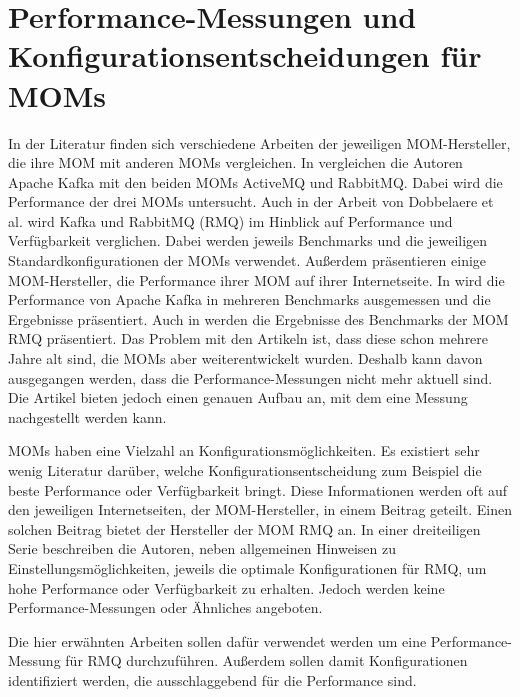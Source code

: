 \section{Performance-Messungen und Konfigurationsentscheidungen für MOMs}
\label{sec:config_mom}
In der Literatur finden sich verschiedene Arbeiten der jeweiligen MOM-Hersteller, die ihre MOM mit anderen MOMs vergleichen. In \cite{kafka} vergleichen die Autoren Apache Kafka mit den beiden MOMs ActiveMQ und RabbitMQ. Dabei wird die Performance der drei MOMs untersucht. Auch in der Arbeit von Dobbelaere et al. \cite{Dobbelaere2017} wird Kafka und RabbitMQ (RMQ) im Hinblick auf Performance und Verfügbarkeit verglichen. Dabei werden jeweils Benchmarks und die jeweiligen Standardkonfigurationen der MOMs verwendet. Außerdem präsentieren einige MOM-Hersteller, die Performance ihrer MOM auf ihrer Internetseite. In \cite{kafkaconfig} wird die Performance von Apache Kafka in mehreren Benchmarks ausgemessen und die Ergebnisse präsentiert. Auch in \cite{rabbitperf} werden die Ergebnisse des Benchmarks der MOM RMQ präsentiert. Das Problem mit den Artikeln ist, dass diese schon mehrere Jahre alt sind, die MOMs aber weiterentwickelt wurden. Deshalb kann davon ausgegangen werden, dass die Performance-Messungen nicht mehr aktuell sind. Die Artikel bieten jedoch einen genauen Aufbau an, mit dem eine Messung nachgestellt werden kann. \par
MOMs haben eine Vielzahl an Konfigurationsmöglichkeiten. Es existiert sehr wenig Literatur darüber, welche Konfigurationsentscheidung zum Beispiel die beste Performance oder Verfügbarkeit bringt. Diese Informationen werden oft auf den jeweiligen Internetseiten, der MOM-Hersteller, in einem Beitrag geteilt. Einen solchen Beitrag bietet der Hersteller der MOM RMQ an. In einer dreiteiligen Serie \cite{rabbitconfig} beschreiben die Autoren, neben allgemeinen Hinweisen zu Einstellungsmöglichkeiten, jeweils die optimale Konfigurationen für RMQ, um hohe Performance oder Verfügbarkeit zu erhalten. Jedoch werden keine Performance-Messungen oder Ähnliches angeboten.\par
Die hier erwähnten Arbeiten sollen dafür verwendet werden um eine Performance-Messung für RMQ durchzuführen. Außerdem sollen damit Konfigurationen identifiziert werden, die ausschlaggebend für die Performance sind.

